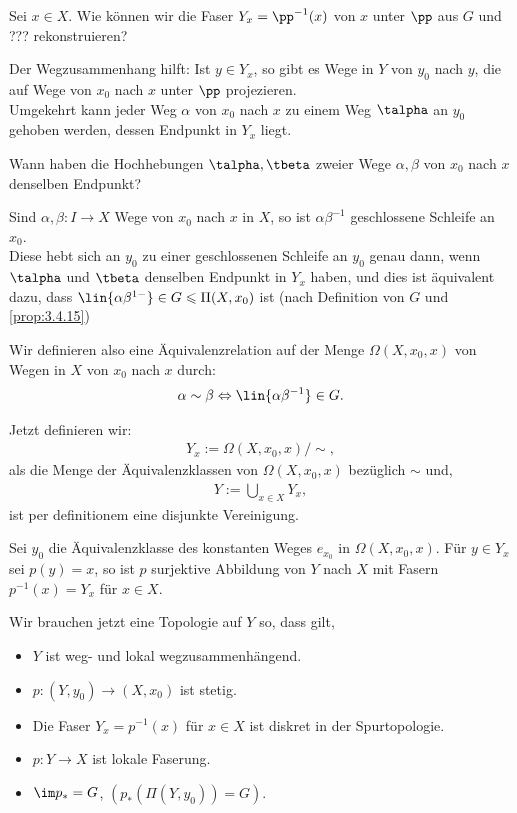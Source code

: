 Sei $x\in X$. Wie können wir die Faser $Y_x = \pp^{-1}(x)$ von $x$ unter $\pp$
aus $G$ und ??? rekonstruieren?

Der Wegzusammenhang hilft: Ist $y\in Y_x$, so gibt es Wege in $Y$ von $y_0$
nach $y$, die auf Wege von $x_0$ nach $x$ unter $\pp$ projezieren.\\
Umgekehrt kann jeder Weg $\alpha$ von $x_0$ nach $x$ zu einem Weg $\talpha$ an
$y_0$ gehoben werden, dessen Endpunkt in $Y_x$ liegt.

Wann haben die Hochhebungen $\talpha,\tbeta$ zweier Wege $\alpha,\beta$ von
$x_0$ nach $x$ denselben Endpunkt?

Sind $\alpha,\beta: I\to X$ Wege von $x_0$ nach $x$ in $X$, so ist
$\alpha\beta^{-1}$ geschlossene Schleife an $x_0$.\\
Diese hebt sich an $y_0$ zu einer geschlossenen Schleife an $y_0$ genau dann,
wenn $\talpha$ und $\tbeta$ denselben Endpunkt in $Y_x$ haben, und dies ist
äquivalent dazu, dass $\lin{\alpha\beta^{1-}}\in G\leqslant \Pi(X,x_0)$ ist
(nach Definition von $G$ und \ref{prop:3.4.15})

Wir definieren also eine Äquivalenzrelation auf der Menge $\Omega(X,x_0,x)$ von
Wegen in $X$ von $x_0$ nach $x$ durch:
\begin{align*}
\alpha\sim\beta \Leftrightarrow \lin{\alpha\beta^{-1}}\in G.
\end{align*}

Jetzt definieren wir:
\begin{align*}
Y_x := \Omega(X,x_0,x)/\sim,
\end{align*}
als die Menge der Äquivalenzklassen von $\Omega(X,x_0,x)$ bezüglich $\sim$ und,
\begin{align*}
Y := \bigcup_{x\in X} Y_x,
\end{align*} 
ist per definitionem eine disjunkte Vereinigung.

Sei $y_0$ die Äquivalenzklasse des konstanten Weges $e_{x_0}$ in
$\Omega(X,x_0,x)$. Für $y\in Y_x$ sei $p(y) = x$, so ist $p$ surjektive
Abbildung von $Y$ nach $X$ mit Fasern $p^{-1}(x) = Y_x$ für $x\in X$.

Wir brauchen jetzt eine Topologie auf $Y$ so, dass gilt,
\begin{itemize}
  \item $Y$ ist weg- und lokal wegzusammenhängend.
  \item $p: (Y,y_0)\to (X,x_0)$ ist stetig.
  \item Die Faser $Y_x = p^{-1}(x)$ für $x\in X$ ist diskret in der
  Spurtopologie.
  \item $p: Y\to X$ ist lokale Faserung.
  \item $\im p_* = G$, $(p_*(\Pi(Y,y_0)) = G)$.
\end{itemize} 


